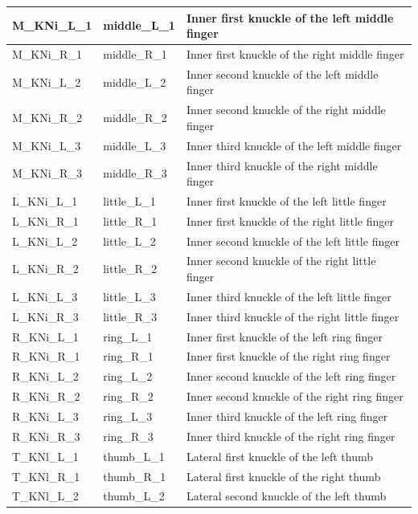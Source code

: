 \documentclass[../main.tex]{subfiles}
\begin{document}
\begin{longtable}{|p{2cm}|p{3cm}|p{5cm}|}
    M\_KNi\_L\_1 & middle\_L\_1 & Inner first knuckle of the left middle finger \\ \hline
    M\_KNi\_R\_1 & middle\_R\_1 & Inner first knuckle of the right middle finger \\ \hline
    M\_KNi\_L\_2 & middle\_L\_2 & Inner second knuckle of the left middle finger \\ \hline
    M\_KNi\_R\_2 & middle\_R\_2 & Inner second knuckle of the right middle finger \\ \hline
    M\_KNi\_L\_3 & middle\_L\_3 & Inner third knuckle of the left middle finger \\ \hline
    M\_KNi\_R\_3 & middle\_R\_3 & Inner third knuckle of the right middle finger \\ \hline
    L\_KNi\_L\_1 & little\_L\_1 & Inner first knuckle of the left little finger \\ \hline
    L\_KNi\_R\_1 & little\_R\_1 & Inner first knuckle of the right little finger \\ \hline
    L\_KNi\_L\_2 & little\_L\_2 & Inner second knuckle of the left little finger \\ \hline
    L\_KNi\_R\_2 & little\_R\_2 & Inner second knuckle of the right little finger \\ \hline
    L\_KNi\_L\_3 & little\_L\_3 & Inner third knuckle of the left little finger \\ \hline
    L\_KNi\_R\_3 & little\_R\_3 & Inner third knuckle of the right little finger \\ \hline
    R\_KNi\_L\_1 & ring\_L\_1 & Inner first knuckle of the left ring finger \\ \hline
    R\_KNi\_R\_1 & ring\_R\_1 & Inner first knuckle of the right ring finger \\ \hline
    R\_KNi\_L\_2 & ring\_L\_2 & Inner second knuckle of the left ring finger \\ \hline
    R\_KNi\_R\_2 & ring\_R\_2 & Inner second knuckle of the right ring finger \\ \hline
    R\_KNi\_L\_3 & ring\_L\_3 & Inner third knuckle of the left ring finger \\ \hline
    R\_KNi\_R\_3 & ring\_R\_3 & Inner third knuckle of the right ring finger \\ \hline
    T\_KNl\_L\_1 & thumb\_L\_1 & Lateral first knuckle of the left thumb \\ \hline
    T\_KNl\_R\_1 & thumb\_R\_1 & Lateral first knuckle of the right thumb \\ \hline
    T\_KNl\_L\_2 & thumb\_L\_2 & Lateral second knuckle of the left thumb \\ \hline

\end{longtable}
\end{document}
